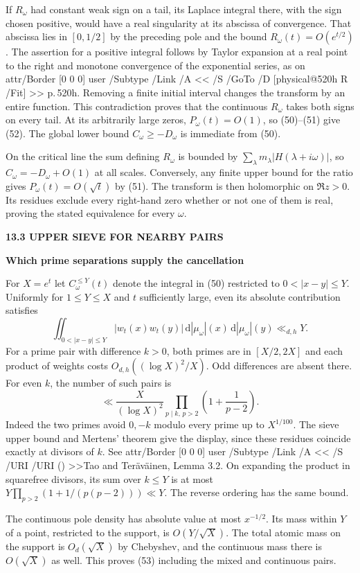 \documentclass[11pt,letterpaper]{article}
\makeatletter
\newcommand{\rightmarktext}{}
\newcommand{\printfolio}{}
\newcommand{\leaf}[4]{\clearpage\gdef\printfolio{#1}\gdef\rightmarktext{#2}%
  {\small\sffamily\bfseries\color{ink}#3\par}\vspace{3pt}%
  {\LARGE\bfseries #4\par}\vspace{5pt}}
\newcommand{\citetitle}[2]{\leavevmode\pdfstartlink attr{/Border [0 0 0]} user{%
 /Subtype /Link /A << /S /URI /URI (\pdfescapestring{\detokenize{#1}}) >>}{\color{ink}#2}\pdfendlink}
\newcommand{\MusicPDFPageRef}[1]{\pdfpageref\csname physical@#1\endcsname\space\space 0 R}
\newcommand{\pagelink}[2]{\leavevmode\pdfstartlink attr{/Border [0 0 0]} user{%
  /Subtype /Link /A << /S /GoTo /D [\MusicPDFPageRef{#1} /Fit] >>}%
  {\color{ink}#2}\pdfendlink}
\newcommand{\pg}[1]{\pagelink{#1}{p.\,#1}}
\makeatother
\begin{document}
If $R_\omega$ had constant weak sign on a tail, its Laplace integral
there, with the sign chosen positive, would have a real singularity
at its abscissa of convergence. That abscissa lies in $[0,1/2]$
by the preceding pole and the bound $R_\omega(t)=O(e^{t/2})$.
The assertion for a positive integral follows by Taylor expansion
at a real point to the right and monotone convergence of the
exponential series, as on \pg{520h}. Removing a finite initial
interval changes the transform by an entire function.
This contradiction proves that the continuous $R_\omega$ takes
both signs on every tail. At its arbitrarily large zeros,
$P_\omega(t)=O(1)$, so (50)--(51) give (52). The global lower
bound $C_\omega\ge-D_\omega$ is immediate from (50).

On the critical line the sum defining $R_\omega$ is bounded by
$\sum_\lambda m_\lambda |H(\lambda+i\omega)|$, so
$C_\omega=-D_\omega+O(1)$ at all scales. Conversely, any finite
upper bound for the ratio gives $P_\omega(t)=O(\sqrt t)$ by (51).
The transform is then holomorphic on $\Re z>0$. Its residues exclude
every right-hand zero whether or not one of them is real, proving
the stated equivalence for every $\omega$.

\leaf{522ag}{Distances between primes}{13.3 \quad UPPER SIEVE FOR NEARBY PAIRS}{Which prime separations supply the cancellation}
For $X=e^t$ let $C_\omega^{\le Y}(t)$ denote the integral in (50)
restricted to $0<|x-y|\le Y$. Uniformly for $1\le Y\le X$ and $t$
sufficiently large, even its absolute contribution satisfies
\[
 \iint_{0<|x-y|\le Y}|w_t(x)w_t(y)|\,
       \mathrm d|\mu_\omega|(x)\,\mathrm d|\mu_\omega|(y)
                 \ll_{d,h}Y .
 \tag{53}
\]
For a prime pair with difference $k>0$, both primes are in
$[X/2,2X]$ and each product of weights costs $O_{d,h}((\log X)^2/X)$.
Odd differences are absent there. For even $k$, the number of such
pairs is
\[
 \ll\frac{X}{(\log X)^2}\prod_{p\mid k,\,p>2}
                       \left(1+\frac1{p-2}\right).
\]
Indeed the two primes avoid $0,-k$ modulo every prime up to
$X^{1/100}$. The sieve upper bound and Mertens' theorem give the
display, since these residues coincide exactly at divisors of $k$.
See \citetitle{https://doi.org/10.1112/jlms.12663}{Tao and Ter\"av\"ainen, Lemma 3.2}.
On expanding the product in squarefree divisors, its sum over
$k\le Y$ is at most $Y\prod_{p>2}(1+1/(p(p-2)))\ll Y$.
The reverse ordering has the same bound.

The continuous pole density has absolute value at most $x^{-1/2}$.
Its mass within $Y$ of a point, restricted to the support, is
$O(Y/\sqrt X)$. The total atomic mass on the support is $O_d(\sqrt X)$
by Chebyshev, and the continuous mass there is $O(\sqrt X)$ as well.
This proves (53) including the mixed and continuous pairs.
\end{document}
